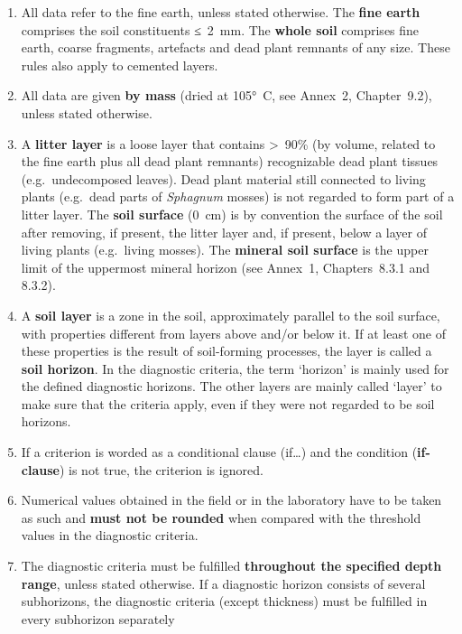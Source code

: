 \documentclass[
  letterpaper,
  DIV=11,
  numbers=noendperiod]{scrreprt}
\providecommand{\tightlist}{%
  \setlength{\itemsep}{0pt}\setlength{\parskip}{0pt}}\usepackage{longtable,booktabs,array}
\begin{document}
\begin{enumerate}
\def\labelenumi{\arabic{enumi}.}
\tightlist
\item
  All data refer to the fine earth, unless stated otherwise. The
  \textbf{fine earth} comprises the soil constituents ≤~2~mm. The
  \textbf{whole soil} comprises fine earth, coarse fragments, artefacts
  and dead plant remnants of any size. These rules also apply to
  cemented layers.
\item
  All data are given \textbf{by mass} (dried at 105°~C, see Annex~2,
  Chapter~9.2), unless stated otherwise.
\item
  A \textbf{litter layer} is a loose layer that contains
  \textgreater~90\% (by volume, related to the fine earth plus all dead
  plant remnants) recognizable dead plant tissues (e.g.~undecomposed
  leaves). Dead plant material still connected to living plants
  (e.g.~dead parts of \emph{Sphagnum} mosses) is not regarded to form
  part of a litter layer. The \textbf{soil surface} (0~cm) is by
  convention the surface of the soil after removing, if present, the
  litter layer and, if present, below a layer of living plants
  (e.g.~living mosses). The \textbf{mineral soil surface} is the upper
  limit of the uppermost mineral horizon (see Annex~1, Chapters~8.3.1
  and 8.3.2).
\item
  A \textbf{soil layer} is a zone in the soil, approximately parallel to
  the soil surface, with properties different from layers above and/or
  below it. If at least one of these properties is the result of
  soil-forming processes, the layer is called a \textbf{soil horizon}.
  In the diagnostic criteria, the term `horizon' is mainly used for the
  defined diagnostic horizons. The other layers are mainly called
  `layer' to make sure that the criteria apply, even if they were not
  regarded to be soil horizons.
\item
  If a criterion is worded as a conditional clause (if\ldots) and the
  condition (\textbf{if-clause}) is not true, the criterion is ignored.
\item
  Numerical values obtained in the field or in the laboratory have to be
  taken as such and \textbf{must not be rounded} when compared with the
  threshold values in the diagnostic criteria.
\item
  The diagnostic criteria must be fulfilled \textbf{throughout the
  specified depth range}, unless stated otherwise. If a diagnostic
  horizon consists of several subhorizons, the diagnostic criteria
  (except thickness) must be fulfilled in every subhorizon separately

\end{enumerate}
\end{document}
